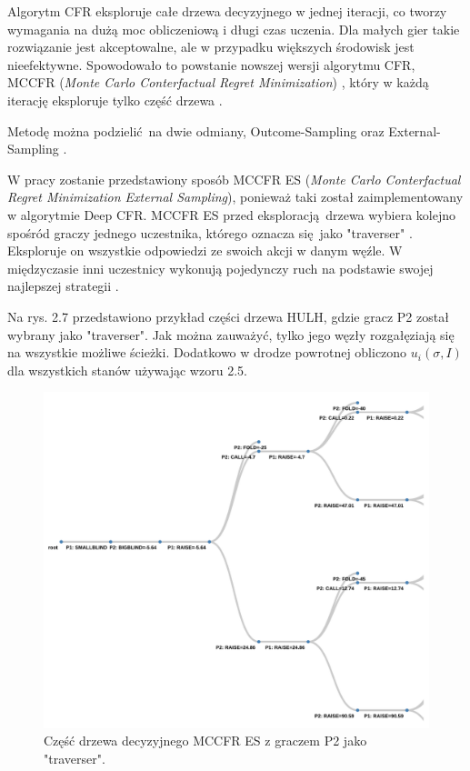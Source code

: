 \documentclass[12pt,oneside,a4paper]{report}
\begin{document}
Algorytm CFR eksploruje całe drzewa decyzyjnego w jednej iteracji, co tworzy wymagania na
dużą moc obliczeniową i długi czas uczenia. Dla małych gier takie rozwiązanie jest akceptowalne, ale w przypadku 
większych środowisk jest nieefektywne.
Spowodowało to powstanie nowszej wersji algorytmu CFR, MCCFR (\emph{Monte Carlo Conterfactual Regret
Minimization}) , 
który w każdą iterację eksploruje tylko część drzewa \cite{mccfr}.

Metodę można podzielić na dwie odmiany, Outcome-Sampling oraz External-Sampling \cite{mccfr}.

W pracy zostanie przedstawiony sposób MCCFR ES (\emph{Monte Carlo Conterfactual Regret
Minimization External Sampling}), ponieważ taki został zaimplementowany w algorytmie
Deep CFR.
MCCFR ES przed eksploracją drzewa wybiera kolejno spośród graczy jednego uczestnika, którego 
oznacza
się jako "traverser" \cite{DCFR}.
Eksploruje on wszystkie odpowiedzi ze swoich akcji w danym węźle. W międzyczasie inni
uczestnicy wykonują pojedynczy ruch na podstawie swojej najlepszej strategii \cite{mccfr}.  


Na rys. 2.7 przedstawiono przykład części drzewa HULH, 
gdzie gracz P2
został wybrany jako "traverser". 
Jak można zauważyć, tylko jego węzły rozgałęziają się na wszystkie możliwe ścieżki. 
Dodatkowo w drodze powrotnej obliczono $u_{i} (\sigma, I)$ dla wszystkich
stanów używając wzoru 
2.5.


\begin{figure}[!ht]
  \centering
  \includegraphics[width=1\textwidth]{./img/tree.pdf}
  \caption{Część drzewa decyzyjnego MCCFR ES z graczem P2 jako "traverser".}
\end{figure}
\end{document}
